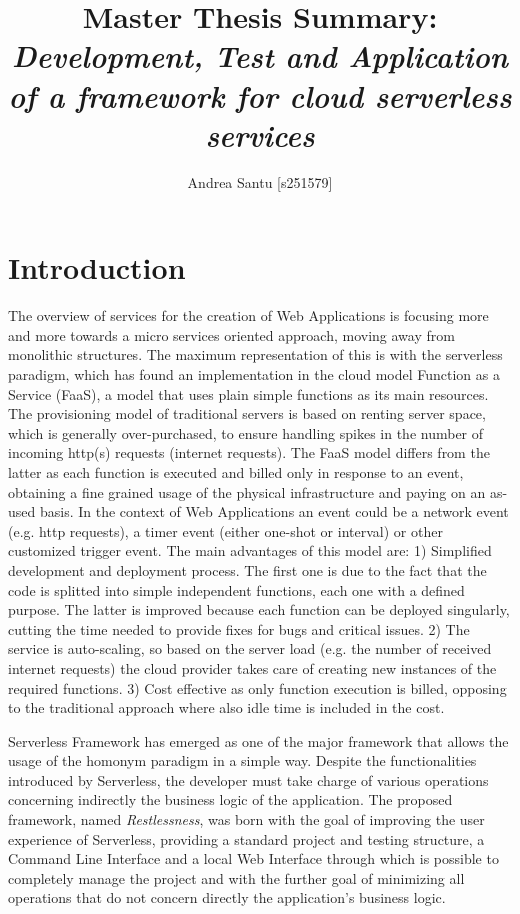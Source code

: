 \documentclass{article}
\begin{document}
\title{Master Thesis Summary: \textit{Development, Test and Application of a framework for cloud serverless services}}

\author{Andrea Santu [s251579]}

\maketitle

\section{Introduction}
The overview of services for the creation of Web Applications is focusing more
and more towards a micro services oriented approach, moving away from monolithic
structures.
The maximum representation of this is with the serverless paradigm, which has
found an implementation in the cloud model Function as a Service (FaaS), a model
that uses plain simple functions as its main resources.
The provisioning model of traditional servers is based on renting server space, which
is generally over-purchased, to ensure handling spikes in the number of incoming
http(s) requests (internet requests).
The FaaS model differs from the latter as each function is executed and billed
only in response to an event, obtaining a fine grained usage of the physical
infrastructure and paying on an as-used basis.
In the context of Web Applications an event could be a network event (e.g. http
requests), a timer event (either one-shot or interval) or other customized trigger
event.
The main advantages of this model are:
1) Simplified development and deployment process. The first one is due to the fact that
the code is splitted into simple independent functions, each one with a defined purpose.
The latter is improved because each function can be deployed singularly, cutting
the time needed to provide fixes for bugs and critical issues.
2) The service is auto-scaling, so based on the server load (e.g. the number of
received internet requests) the cloud provider takes care of creating new instances
of the required functions.
3) Cost effective as only function execution is billed, opposing to the traditional
approach where also idle time is included in the cost.

\noindent
Serverless Framework has emerged as one of the major framework that allows the
usage of the homonym paradigm in a simple way.
Despite the functionalities introduced by Serverless, the developer must take
charge of various operations concerning indirectly the business logic of the
application.
The proposed framework, named \textit{Restlessness}, was born with the goal of
improving the user experience of Serverless, providing a standard project and testing
structure, a Command Line Interface and a local Web Interface through which is
possible to completely manage the project and with the further goal of minimizing
all operations that do not concern directly the application's business logic.
\end{document}
